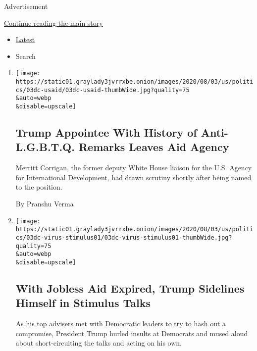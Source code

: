 Advertisement

\protect\hyperlink{after-mid1}{Continue reading the main story}

\begin{itemize}
\tightlist
\item
  \protect\hyperlink{stream-panel}{Latest}
\item
  Search
\end{itemize}

\begin{enumerate}
\def\labelenumi{\arabic{enumi}.}
\item
  \href{/2020/08/03/us/politics/merritt-corrigan-usaid.html}{}

  \texttt{[image: https://static01.graylady3jvrrxbe.onion/images/2020/08/03/us/politics/03dc-usaid/03dc-usaid-thumbWide.jpg?quality=75\\\&auto=webp\\\&disable=upscale]}

  \hypertarget{trump-appointee-with-history-of-anti-lgbtq-remarks-leaves-aid-agency}{%
  \subsection{Trump Appointee With History of Anti-L.G.B.T.Q. Remarks
  Leaves Aid
  Agency}\label{trump-appointee-with-history-of-anti-lgbtq-remarks-leaves-aid-agency}}

  Merritt Corrigan, the former deputy White House liaison for the U.S.
  Agency for International Development, had drawn scrutiny shortly after
  being named to the position.

  By Pranshu Verma
\item
  \href{/2020/08/03/us/politics/congress-jobless-aid-talks-trump.html}{}

  \texttt{[image: https://static01.graylady3jvrrxbe.onion/images/2020/08/03/us/politics/03dc-virus-stimulus01/03dc-virus-stimulus01-thumbWide.jpg?quality=75\\\&auto=webp\\\&disable=upscale]}

  \hypertarget{with-jobless-aid-expired-trump-sidelines-himself-in-stimulus-talks-1}{%
  \subsection{With Jobless Aid Expired, Trump Sidelines Himself in
  Stimulus
  Talks}\label{with-jobless-aid-expired-trump-sidelines-himself-in-stimulus-talks-1}}

  As his top advisers met with Democratic leaders to try to hash out a
  compromise, President Trump hurled insults at Democrats and mused
  aloud about short-circuiting the talks and acting on his own.


\end{enumerate}
